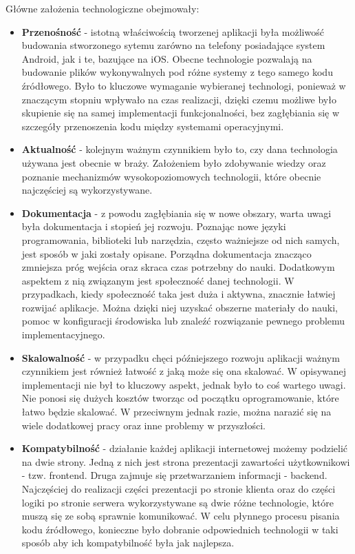 Główne założenia technologiczne obejmowały:
\begin{itemize}
    \item \textbf{Przenośność} - istotną właściwością tworzenej aplikacji była
    możliwość budowania stworzonego sytemu zarówno na telefony posiadające
    system Android, jak i te, bazujące na iOS. Obecne technologie pozwalają na
    budowanie plików wykonywalnych pod różne systemy z tego samego kodu
    źródłowego. Było to kluczowe wymaganie wybieranej technologi, ponieważ w
    znaczącym stopniu wpływało na czas realizacji, dzięki czemu możliwe było
    skupienie się na samej implementacji funkcjonalności, bez zagłębiania się w
    szczegóły przenoszenia kodu między systemami operacyjnymi.
    \item \textbf{Aktualność} - kolejnym ważnym czynnikiem było to, czy dana
    technologia używana jest obecnie w braży. Założeniem było zdobywanie wiedzy
    oraz poznanie mechanizmów wysokopoziomowych technologii, które obecnie
    najczęściej są wykorzystywane.
    \item \textbf{Dokumentacja} - z powodu zagłębiania się w nowe obszary, warta
    uwagi była dokumentacja i stopień jej rozwoju. Poznając nowe języki
    programowania, biblioteki lub narzędzia, często ważniejsze od nich samych,
    jest sposób w jaki zostały opisane. Porządna dokumentacja znacząco zmniejsza
    próg wejścia oraz skraca czas potrzebny do nauki. Dodatkowym aspektem z nią
    związanym jest społeczność danej technologii. W przypadkach, kiedy
    społeczność taka jest duża i aktywna, znacznie łatwiej rozwijać aplikacje.
    Można dzięki niej uzyskać obszerne materiały do nauki, pomoc w konfiguracji
    środowiska lub znaleźć rozwiązanie pewnego problemu implementacyjnego.
    \item \textbf{Skalowalność} - w przypadku chęci późniejszego rozwoju
    aplikacji ważnym czynnikiem jest również łatwość z jaką może się ona
    skalować. W opisywanej implementacji nie był to kluczowy aspekt, jednak było
    to coś wartego uwagi. Nie ponosi się dużych kosztów tworząc od początku
    oprogramowanie, które łatwo będzie skalować. W przeciwnym jednak razie,
    można narazić się na wiele dodatkowej pracy oraz inne problemy w
    przyszłości.
    \item \textbf{Kompatybilność} - działanie każdej aplikacji internetowej
    możemy podzielić na dwie strony. Jedną z nich jest strona prezentacji
    zawartości użytkownikowi - tzw. frontend. Druga zajmuje się
    przetwarzaniem informacji - backend. Najczęściej do realizacji części
    prezentacji po stronie klienta oraz do części logiki po stronie serwera
    wykorzystywane są dwie różne technologie, które muszą się ze sobą sprawnie
    komunikować. W celu płynnego procesu pisania kodu źródłowego, konieczne było
    dobranie odpowiednich technologii w taki sposób aby ich kompatybilność była
    jak najlepsza.
\end{itemize}

